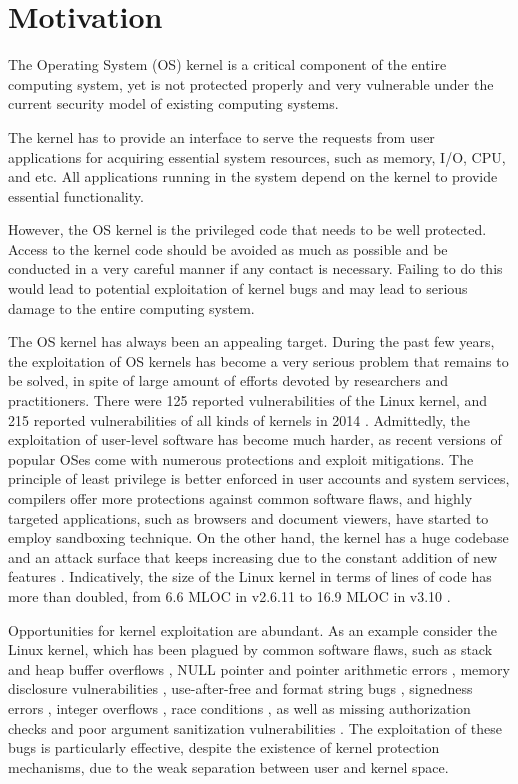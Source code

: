 \section{Motivation}
\label{sec.motivation}

The Operating System (OS) kernel is a critical component of the entire computing system, 
yet is not protected properly and very vulnerable under the current security model of existing 
computing systems.

The kernel has to provide an interface to serve the requests from user applications for acquiring 
essential system resources, such as memory, I/O, CPU, and etc. 
All applications running in the system depend on the kernel to provide essential functionality. 

However, the OS kernel is the privileged code that needs to be well protected. Access to the
kernel code should be avoided as much as possible and be conducted in a very careful manner 
if any contact is necessary. Failing to do this would lead to potential exploitation of kernel bugs and 
may lead to serious damage to the entire computing system.  

The OS kernel has always been an appealing target. During the past few years, 
the exploitation of OS kernels has become a very serious problem that remains to be solved, 
in spite of large amount of efforts devoted by researchers and practitioners. 
There were 125 reported vulnerabilities of the Linux kernel, and 215 reported vulnerabilities 
of all kinds of kernels in 2014 \cite{NVD:14}. Admittedly, the exploitation of user-level software 
has become much harder, as recent versions of popular OSes come with numerous protections 
and exploit mitigations. The principle of least privilege is better enforced in user accounts 
and system services, compilers offer more protections against common software flaws, 
and highly targeted applications, such as browsers and document viewers, have started to 
employ sandboxing technique. On the other hand, the kernel has a huge codebase and 
an attack surface that keeps increasing due to the constant addition of 
new features \cite{Metrics:13}. Indicatively, the size of the Linux kernel in terms of lines of code 
has more than doubled, from 6.6 MLOC in v2.6.11 to 16.9 MLOC in v3.10 \cite{Linux:13}.

Opportunities for kernel exploitation are abundant. As an example consider the Linux kernel, 
which has been plagued by common software flaws, such as stack and heap buffer overflows 
\cite{CVE:20093234, CVE:20131828, CVE:20132892}, NULL pointer and pointer arithmetic errors 
\cite{CVE:20050736, CVE:20092698}, memory disclosure vulnerabilities 
\cite{CVE:20093002, CVE:20104073}, use-after-free and format string bugs 
\cite{CVE:20132852, CVE:20134343}, signedness errors \cite{CVE:20103437, CVE:20132094}, 
integer overflows \cite{CVE:20050736, CVE:20102959}, race conditions 
\cite{CVE:20091527, CVE:20093547}, as well as missing authorization checks and 
poor argument sanitization vulnerabilities 
\cite{CVE:20103904, CVE:20104347, CVE:20120946, CVE:20130268}. 
The exploitation of these bugs is particularly effective, 
despite the existence of kernel protection mechanisms, 
due to the weak separation between user and kernel space.

